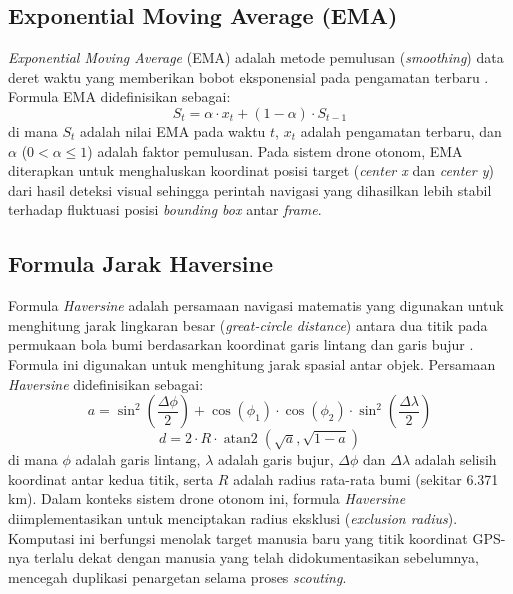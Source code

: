 \subsection{Exponential Moving Average (EMA)}
\textit{Exponential Moving Average} (EMA) adalah metode pemulusan (\textit{smoothing}) data deret waktu yang memberikan bobot eksponensial pada pengamatan terbaru \cite{Hunter1986EMA}. Formula EMA didefinisikan sebagai:
\begin{equation}
	S_t = \alpha \cdot x_t + (1 - \alpha) \cdot S_{t-1}
\end{equation}
di mana $S_t$ adalah nilai EMA pada waktu $t$, $x_t$ adalah pengamatan terbaru, dan $\alpha$ ($0 < \alpha \leq 1$) adalah faktor pemulusan. Pada sistem drone otonom, EMA diterapkan untuk menghaluskan koordinat posisi target (\textit{center x} dan \textit{center y}) dari hasil deteksi visual sehingga perintah navigasi yang dihasilkan lebih stabil terhadap fluktuasi posisi \textit{bounding box} antar \textit{frame}.

\subsection{Formula Jarak Haversine}
Formula \textit{Haversine} adalah persamaan navigasi matematis yang digunakan untuk menghitung jarak lingkaran besar (\textit{great-circle distance}) antara dua titik pada permukaan bola bumi berdasarkan koordinat garis lintang dan garis bujur \cite{Sinnott1984Haversine}. Formula ini digunakan untuk menghitung jarak spasial antar objek. Persamaan \textit{Haversine} didefinisikan sebagai:
\begin{equation}
	a = \sin^2\left(\frac{\Delta \phi}{2}\right) + \cos(\phi_1) \cdot \cos(\phi_2) \cdot \sin^2\left(\frac{\Delta \lambda}{2}\right)
\end{equation}
\begin{equation}
	d = 2 \cdot R \cdot \operatorname{atan2}\left(\sqrt{a}, \sqrt{1-a}\right)
\end{equation}
di mana $\phi$ adalah garis lintang, $\lambda$ adalah garis bujur, $\Delta \phi$ dan $\Delta \lambda$ adalah selisih koordinat antar kedua titik, serta $R$ adalah radius rata-rata bumi (sekitar 6.371 km). Dalam konteks sistem drone otonom ini, formula \textit{Haversine} diimplementasikan untuk menciptakan radius eksklusi (\textit{exclusion radius}). Komputasi ini berfungsi menolak target manusia baru yang titik koordinat GPS-nya terlalu dekat dengan manusia yang telah didokumentasikan sebelumnya, mencegah duplikasi penargetan selama proses \textit{scouting}.

